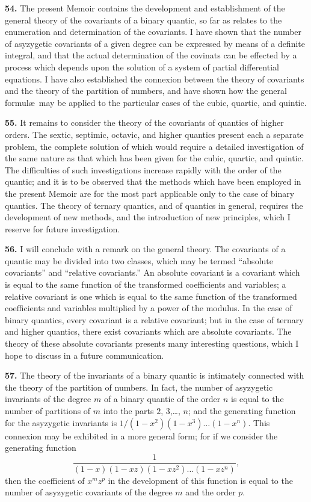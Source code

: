 \documentclass[11pt,a4paper]{article}
\begin{document}
\clearpage
\setcounter{page}{270}

\textbf{54.} The present Memoir contains the development and establishment of the general theory of the covariants of a binary quantic, so far as relates to the enumeration and determination of the covariants. I have shown that the number of asyzygetic covariants of a given degree can be expressed by means of a definite integral, and that the actual determination of the covinats can be effected by a process which depends upon the solution of a system of partial differential equations. I have also established the connexion between the theory of covariants and the theory of the partition of numbers, and have shown how the general formul\ae\ may be applied to the particular cases of the cubic, quartic, and quintic.

\textbf{55.} It remains to consider the theory of the covariants of quantics of higher orders. The sextic, septimic, octavic, and higher quantics present each a separate problem, the complete solution of which would require a detailed investigation of the same nature as that which has been given for the cubic, quartic, and quintic. The difficulties of such investigations increase rapidly with the order of the quantic; and it is to be observed that the methods which have been employed in the present Memoir are for the most part applicable only to the case of binary quantics. The theory of ternary quantics, and of quantics in general, requires the development of new methods, and the introduction of new principles, which I reserve for future investigation.

\textbf{56.} I will conclude with a remark on the general theory. The covariants of a quantic may be divided into two classes, which may be termed ``absolute covariants'' and ``relative covariants.'' An absolute covariant is a covariant which is equal to the same function of the transformed coefficients and variables; a relative covariant is one which is equal to the same function of the transformed coefficients and variables multiplied by a power of the modulus. In the case of binary quantics, every covariant is a relative covariant; but in the case of ternary and higher quantics, there exist covariants which are absolute covariants. The theory of these absolute covariants presents many interesting questions, which I hope to discuss in a future communication.

\clearpage
\setcounter{page}{271}

\textbf{57.} The theory of the invariants of a binary quantic is intimately connected with the theory of the partition of numbers. In fact, the number of asyzygetic invariants of the degree $m$ of a binary quantic of the order $n$ is equal to the number of partitions of $m$ into the parts $2$, $3$,\ldots, $n$; and the generating function for the asyzygetic invariants is $1/(1-x^{2})(1-x^{3})\ldots(1-x^{n})$. This connexion may be exhibited in a more general form; for if we consider the generating function
\[
\frac{1}{(1-x)(1-xz)(1-xz^{2})\ldots(1-xz^{n})},
\]
then the coefficient of $x^{m}z^{p}$ in the development of this function is equal to the number of asyzygetic covariants of the degree $m$ and the order $p$.
\end{document}
